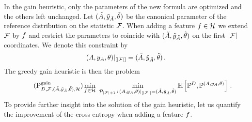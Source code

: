 In the gain heuristic, only the parameters of the new formula are optimized and the others left unchanged.
Let $(\tilde{A},\tilde{y}_{\tilde{A}},\tilde{\theta})$ be the canonical parameter of the reference distribution on the statistic $\mathcal{F}$.
When adding a feature $f\in\mathcal{H}$ we extend $\mathcal{F}$ by $f$ and restrict the parameters to coincide with $(\tilde{A},\tilde{y}_{\tilde{A}},\tilde{\theta})$ on the first $\left|\mathcal{F}\right|$ coordinates.
We denote this constraint by
\begin{align*}
    {(A,y_{A},\theta)}|_{[\left|\mathcal{F}\right|]} = (\tilde{A},\tilde{y}_{\tilde{A}},\tilde{\theta}) \, .
\end{align*}
The greedy gain heuristic is then the problem
\begin{align}
    \label{prob:greedyGain}\tag{$\probtagtypeinst{\gainsymbol}{\datamap,\formulaset,\sechybridparam,\greedyhypothesis}$}
    \min_{\formula\in\greedyhypothesis} \,\, \min_{\hybridparamsetofdim{\cardof{\hlnstat}+1} \wcols \restrictionofto{\hybridparam}{[\cardof{\hlnstat}]} = \sechybridparam }
    \centropyof{\empdistribution}{\probof{\hybridparam}} \, .
\end{align}
To provide further insight into the solution of the gain heuristic, let us quantify the improvement of the cross entropy when adding a feature $f$.

